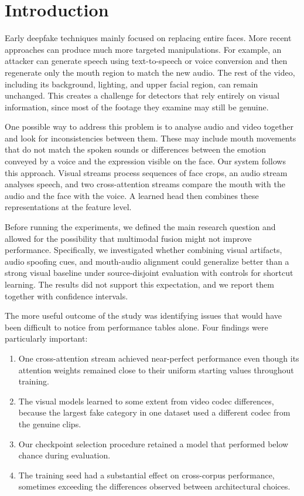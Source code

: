 \documentclass[conference]{IEEEtran}
\begin{document}
\section{Introduction}

Early deepfake techniques mainly focused on replacing entire faces. More
recent approaches can produce much more targeted manipulations. For example,
an attacker can generate speech using text-to-speech or voice conversion and
then regenerate only the mouth region to match the new audio. The rest of the
video, including its background, lighting, and upper facial region, can remain
unchanged. This creates a challenge for detectors that rely entirely on
visual information, since most of the footage they examine may still be
genuine.

One possible way to address this problem is to analyse audio and video
together and look for inconsistencies between them. These may include mouth
movements that do not match the spoken sounds or differences between the
emotion conveyed by a voice and the expression visible on the face. Our
system follows this approach. Visual streams process sequences of face crops,
an audio stream analyses speech, and two cross-attention streams compare the
mouth with the audio and the face with the voice. A learned head then combines
these representations at the feature level.

Before running the experiments, we defined the main research question and
allowed for the possibility that multimodal fusion might not improve
performance. Specifically, we investigated whether combining visual
artifacts, audio spoofing cues, and mouth-audio alignment could generalize
better than a strong visual baseline under source-disjoint evaluation with
controls for shortcut learning. The results did not support this expectation,
and we report them together with confidence intervals.

The more useful outcome of the study was identifying issues that would have
been difficult to notice from performance tables alone. Four findings were
particularly important:

\begin{enumerate}
\item One cross-attention stream achieved near-perfect performance even
though its attention weights remained close to their uniform starting values
throughout training.
\item The visual models learned to some extent from video codec differences,
because the largest fake category in one dataset used a different codec from
the genuine clips.
\item Our checkpoint selection procedure retained a model that performed
below chance during evaluation.
\item The training seed had a substantial effect on cross-corpus performance,
sometimes exceeding the differences observed between architectural choices.
\end{enumerate}
\end{document}

